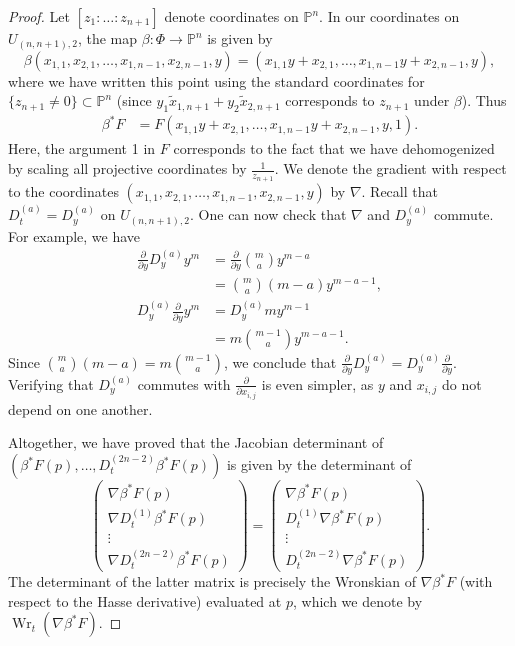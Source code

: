 \documentclass[12pt]{amsart}
\numberwithin{equation}{section}
\theoremstyle{plain}
\theoremstyle{definition}
\newcommand{\mb}[1]{\mathbb{#1}}
\newcommand{\Wr}{\operatorname{Wr}}
\begin{document}
\begin{proof}
    Let $[z_1:\ldots:z_{n+1}]$ denote coordinates on $\mb{P}^n$. In our coordinates on $U_{(n,n+1),2}$, the map $\beta\colon \Phi\to\mb{P}^n$ is given by
    \[\beta(x_{1,1},x_{2,1},\ldots,x_{1,n-1},x_{2,n-1},y)=(x_{1,1}y+x_{2,1},\ldots,x_{1,n-1}y+x_{2,n-1},y),\]
    where we have written this point using the standard coordinates for $\{z_{n+1}\neq 0\}\subset\mb{P}^n$ (since $y_1\tilde{x}_{1,n+1}+y_2\tilde{x}_{2,n+1}$ corresponds to $z_{n+1}$ under $\beta$). Thus
    \begin{align*}
    \beta^*F&=F(x_{1,1}y+x_{2,1},\ldots,x_{1,n-1}y+x_{2,n-1},y,1).
    \end{align*}
    Here, the argument 1 in $F$ corresponds to the fact that we have dehomogenized by scaling all projective coordinates by $\frac{1}{z_{n+1}}$.     We denote the gradient with respect to the coordinates $(x_{1,1},x_{2,1},\ldots,x_{1,n-1},x_{2,n-1},y)$ by $\nabla$. Recall that $D^{(a)}_t=D^{(a)}_y$ on $U_{(n,n+1),2}$. One can now check that $\nabla$ and $D^{(a)}_y$ commute. For example, we have
    \begin{align*}
        \frac{\partial}{\partial y}D^{(a)}_y y^m&=\frac{\partial}{\partial y}\binom{m}{a}y^{m-a}\\
        &=\binom{m}{a}(m-a)y^{m-a-1},\\
        D^{(a)}_y\frac{\partial}{\partial y}y^m&=D^{(a)}_ymy^{m-1}\\
        &=m\binom{m-1}{a}y^{m-a-1}.
    \end{align*}
    Since $\binom{m}{a}(m-a)=m\binom{m-1}{a}$, we conclude that $\frac{\partial}{\partial y}D^{(a)}_y=D^{(a)}_y\frac{\partial}{\partial y}$. Verifying that $D^{(a)}_y$ commutes with $\frac{\partial}{\partial x_{i,j}}$ is even simpler, as $y$ and $x_{i,j}$ do not depend on one another.
    
    Altogether, we have proved that the Jacobian determinant of $(\beta^*F(p),\ldots,D^{(2n-2)}_t\beta^*F(p))$ is given by the determinant of
    \[\begin{pmatrix}
        \nabla\beta^*F(p)\\
        \nabla D^{(1)}_t\beta^*F(p)\\
        \vdots\\
        \nabla D^{(2n-2)}_t\beta^*F(p)
    \end{pmatrix}=
    \begin{pmatrix}
        \nabla\beta^*F(p)\\
        D^{(1)}_t\nabla\beta^*F(p)\\
        \vdots\\
        D^{(2n-2)}_t\nabla\beta^*F(p)
    \end{pmatrix}.\]
    The determinant of the latter matrix is precisely the Wronskian of $\nabla\beta^*F$ (with respect to the Hasse derivative) evaluated at $p$, which we denote by $\Wr_t(\nabla\beta^*F)$.
\end{proof}
\end{document}
